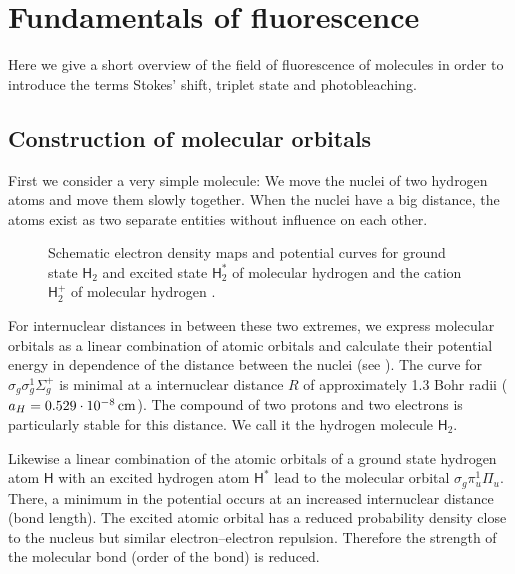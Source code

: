\newenvironment{fenster}{%
  \begin{addmargin*}[
  5em]{5em}%
    \begin{minipage}{\linewidth}%
    \vspace{1em}
      \rule{\linewidth}{2pt}%
}{%
    \rule[
.25\baselineskip]{\linewidth}{2pt}%
\vspace{1em}
    \end{minipage}%
  \end{addmargin*}%
}
\renewcommand{\H}{\textsf{H}}
\renewcommand{\O}{\textsf{O}}
\section{Fundamentals of fluorescence}
\begin{summary}
  Here we give a short overview of the field of fluorescence of
  molecules in order to introduce the terms Stokes' shift, triplet
  state and photobleaching.
\end{summary}
\subsection{Construction of molecular orbitals}
First we consider a very simple molecule: We move the nuclei of two
hydrogen atoms and move them slowly together. When the nuclei have a
big distance, the atoms exist as two separate entities without
influence on each other.
\begin{figure}[!hbt]
  \centering
  
  \caption{Schematic electron density maps and potential curves for
    ground state $\H_2$ and excited state $\H_2^*$ of molecular
    hydrogen and the cation $\H_2^+$ of molecular hydrogen
    \citep[inspired from][p.~258]{Haken2006}.}
  \label{fig:flu-potential_my}
\end{figure}

For internuclear distances in between these two extremes, we express
molecular orbitals as a linear combination of atomic orbitals and
calculate their potential energy in dependence of the distance between
the nuclei (see ). The curve for
$\sigma_g\sigma_g^1\Sigma_g^+$ is minimal at a internuclear distance
$R$ of approximately 1.3 Bohr radii
($a_H=\unit[0.529\cdot10^{-8}]{cm}$). The compound of two protons and
two electrons is particularly stable for this distance. We call it the
hydrogen molecule $\H_2$.

Likewise a linear combination of the atomic orbitals of a ground state
hydrogen atom $\H$ with an excited hydrogen atom $\H^*$ lead to the
molecular orbital $\sigma_g\pi_u^1\Pi_u$. There, a minimum in the
potential occurs at an increased internuclear distance (bond
length). The excited atomic orbital has a reduced probability density
close to the nucleus but similar electron--electron
repulsion. Therefore the strength of the molecular bond (order of the
bond) is reduced.
\newcommand{\vmu}{\mbox{\boldmath{$\mu$}}}
